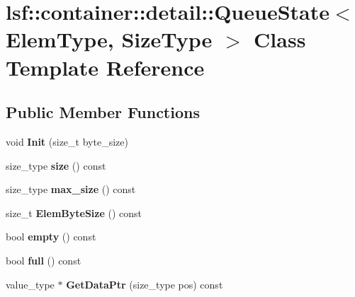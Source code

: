 \hypertarget{classlsf_1_1container_1_1detail_1_1QueueState}{
\section{lsf::container::detail::QueueState$<$ ElemType, SizeType $>$ Class Template Reference}
\label{classlsf_1_1container_1_1detail_1_1QueueState}
}
\subsection*{Public Member Functions}
\begin{DoxyCompactItemize}
\item 
\hypertarget{classlsf_1_1container_1_1detail_1_1QueueState_a3c79dbfafbd8b80080023af1bd897e3d}{
void {\bfseries Init} (size\_\-t byte\_\-size)}
\label{classlsf_1_1container_1_1detail_1_1QueueState_a3c79dbfafbd8b80080023af1bd897e3d}

\item 
\hypertarget{classlsf_1_1container_1_1detail_1_1QueueState_a429b15161a9167e6b794de8620f71446}{
size\_\-type {\bfseries size} () const }
\label{classlsf_1_1container_1_1detail_1_1QueueState_a429b15161a9167e6b794de8620f71446}

\item 
\hypertarget{classlsf_1_1container_1_1detail_1_1QueueState_ac57ab9be16e85d13475e06b855c2d736}{
size\_\-type {\bfseries max\_\-size} () const }
\label{classlsf_1_1container_1_1detail_1_1QueueState_ac57ab9be16e85d13475e06b855c2d736}

\item 
\hypertarget{classlsf_1_1container_1_1detail_1_1QueueState_ada74fc0c760af648d31100d6856e2e9a}{
size\_\-t {\bfseries ElemByteSize} () const }
\label{classlsf_1_1container_1_1detail_1_1QueueState_ada74fc0c760af648d31100d6856e2e9a}

\item 
\hypertarget{classlsf_1_1container_1_1detail_1_1QueueState_a99c4bab3ed1dc8adf1af3bf856b0ad11}{
bool {\bfseries empty} () const }
\label{classlsf_1_1container_1_1detail_1_1QueueState_a99c4bab3ed1dc8adf1af3bf856b0ad11}

\item 
\hypertarget{classlsf_1_1container_1_1detail_1_1QueueState_a8cbec852e7d79e6bc54318c1615e691e}{
bool {\bfseries full} () const }
\label{classlsf_1_1container_1_1detail_1_1QueueState_a8cbec852e7d79e6bc54318c1615e691e}

\item 
\hypertarget{classlsf_1_1container_1_1detail_1_1QueueState_aabcff8f41fe6f47d249378046d1ba780}{
value\_\-type $\ast$ {\bfseries GetDataPtr} (size\_\-type pos) const }
\label{classlsf_1_1container_1_1detail_1_1QueueState_aabcff8f41fe6f47d249378046d1ba780}


\end{DoxyCompactItemize}
